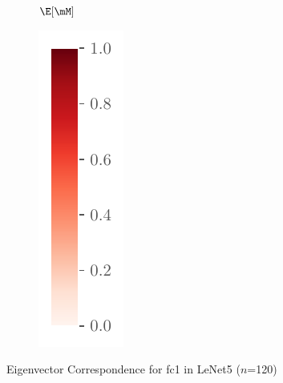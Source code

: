\begin{figure}[ht]
\begin{subfigure}[t]{0.46\textwidth}
        \caption{$\E[\mM]$}
        \label{fig:Corr_UTAU_True_fc}
    \end{subfigure}
    \begin{subfigure}[t]{0.065\textwidth}
        \centering
        \includegraphics[width=\textwidth]{Figures/Misc/colorbar.pdf}
    \end{subfigure}
    \caption{Eigenvector Correspondence for fc1 in LeNet5 ($n$=120)}
    \label{fig:Corr_fc}
\end{figure}
